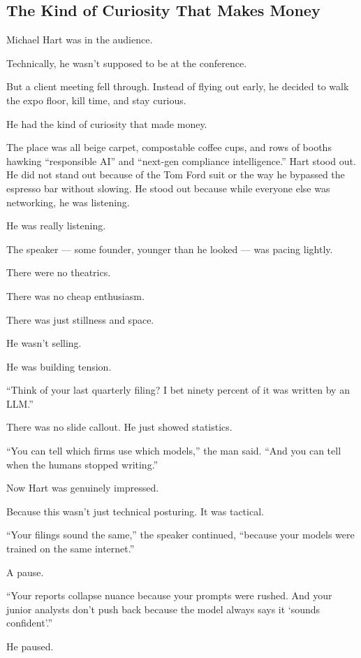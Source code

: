 \subsection{The Kind of Curiosity That Makes Money}

Michael Hart was in the audience.

Technically, he wasn’t supposed to be at the conference.

But a client meeting fell through. Instead of flying out early, he decided to walk the expo floor, 
kill time, and stay curious. 

He had the kind of curiosity that made money.

The place was all beige carpet, compostable coffee cups, and rows of booths hawking ``responsible AI''
and ``next-gen compliance intelligence.'' Hart stood out. He did not stand out because of the Tom Ford suit 
or the way he bypassed the espresso bar without slowing. 
He stood out because while everyone else was networking, he was listening.

He was really listening.

The speaker --- some founder, younger than he looked --- was pacing lightly. 

There were no theatrics. 

There was no cheap enthusiasm. 

There was just stillness and space. 

He wasn’t selling. 

He was building tension.

``Think of your last quarterly filing? I bet ninety percent of it was written by an LLM.''

There was no slide callout. 
He just showed statistics.

``You can tell which firms use which models,'' 
the man said. 
``And you can tell when the humans stopped writing.''

Now Hart was genuinely impressed.

Because this wasn’t just technical posturing. 
It was tactical.

``Your filings sound the same,'' 
the speaker continued, 
``because your models were trained on the same internet.'' 

A pause.

``Your reports collapse nuance because your prompts were rushed. 
And your junior analysts don’t push back because the model always says it `sounds confident'.''

He paused.

